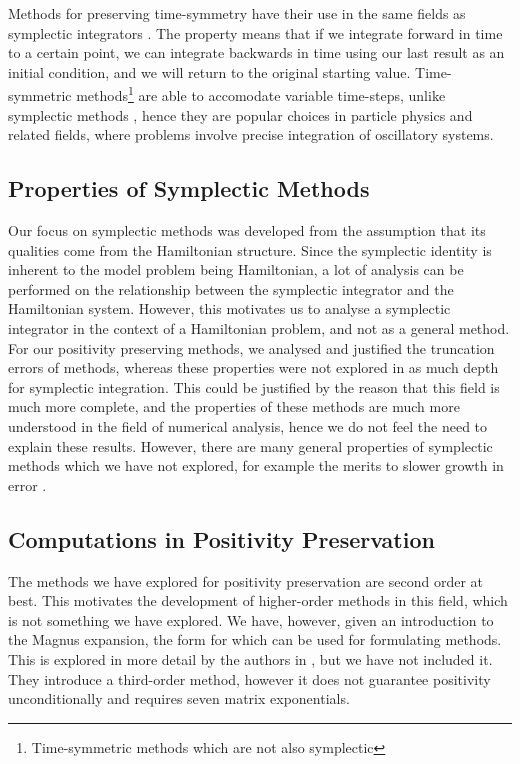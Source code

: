 Methods for preserving time-symmetry have their use in the same fields as symplectic integrators \cite{hernandez2018timesym}.
The property means that if we integrate forward in time to a certain point, we can integrate backwards in time using our last result as an initial condition, and we will return to the original starting value.
Time-symmetric methods\footnote{
    Time-symmetric methods which are not also symplectic
} are able to accomodate variable time-steps, unlike symplectic methods \cite{gni2006},
hence they are popular choices in particle physics and related fields, where problems involve precise integration of oscillatory systems.

\subsection{Properties of Symplectic Methods}

Our focus on symplectic methods was developed from the assumption that its qualities come from the Hamiltonian structure.
Since the symplectic identity is inherent to the model problem being Hamiltonian, a lot of analysis can be performed on the relationship between the symplectic integrator and the Hamiltonian system.
However, this motivates us to analyse a symplectic integrator in the context of a Hamiltonian problem, and not as a general method.
For our positivity preserving methods, we analysed and justified the truncation errors of methods,
whereas these properties were not explored in as much depth for symplectic integration.
This could be justified by the reason that this field is much more complete, and the properties of these methods are much more understood in the field of numerical analysis, hence we do not feel the need to explain these results.
However, there are many general properties of symplectic methods which we have not explored, for example the merits to slower growth in error \cite{gni2006}.

\subsection{Computations in Positivity Preservation}

The methods we have explored for positivity preservation are second order at best.
This motivates the development of higher-order methods in this field, which is not something we have explored.
We have, however, given an introduction to the Magnus expansion, the form for which can be used for formulating methods.
This is explored in more detail by the authors in \cite{blanes_pos_2022}, but we have not included it.
They introduce a third-order method, however it does not guarantee positivity unconditionally and requires seven matrix exponentials.


